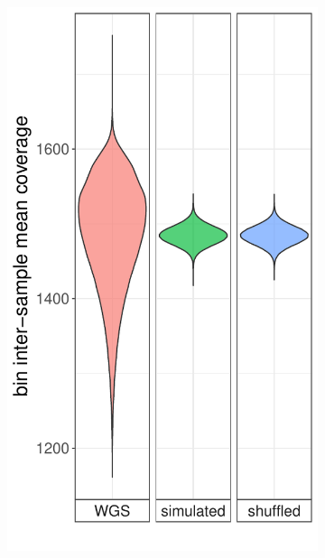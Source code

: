 \begin{figure}[!h]
  \begin{subfigure}[b]{.3\linewidth}
    \includegraphics[width=\linewidth,page=1]{figures/epilepsy-biasWGS-thin.pdf}
    \caption{}
    \label{fig:wgsbias}
  \end{subfigure}
  \unskip\ \vrule\
  \begin{subfigure}[b]{.7\linewidth}

\end{subfigure}
\end{figure}
